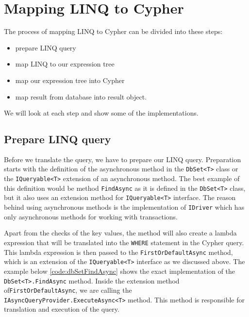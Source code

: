 \section{Mapping LINQ to Cypher}

The process of mapping LINQ to Cypher can be divided into these steps:
\begin{itemize}
    \item {prepare LINQ query}
    \item {map LINQ to our expression tree}
    \item {map our expression tree into Cypher}
    \item {map result from database into result object.}
\end{itemize}
We will look at each step and show some of the implementations.

\subsection{Prepare LINQ query}

Before we translate the query, we have to prepare our LINQ query. Preparation starts with the definition of the asynchronous method in the \texttt{DbSet<T>} class
or the \texttt{IQueryable<T>} extension of an asynchronous method. The best example of this definition would be method \texttt{FindAsync} as it is defined
in the \texttt{DbSet<T>} class, but it also uses an extension method for \texttt{IQueryable<T>} interface. The reason behind using asynchronous methods is
the implementation of \texttt{IDriver} which has only asynchronous methods for working with transactions.

Apart from the checks of the key values, the method will also create a lambda expression that will be translated into the \texttt{WHERE} statement
in the Cypher query. This lambda expression is then passed to the \texttt{FirstOrDefaultAsync} method, which is an extension of the \texttt{IQueryable<T>} interface
as we discussed above. The example below \ref{code:dbSetFindAsync} shows the exact implementation of the \texttt{DbSet<T>.FindAsync} method.
Inside the extension method of\linebreak\texttt{FirstOrDefaultAsync}, we are calling the \texttt{IAsyncQueryProvider.ExecuteAsync<T>} method. This method
is responsible for translation and execution of the query.

